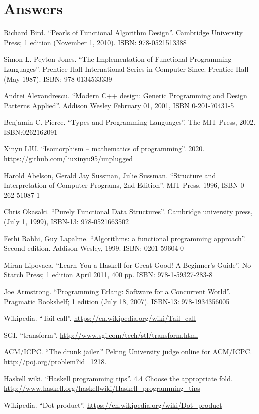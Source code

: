 \documentclass[b5paper]{article}
\begin{document}
\ifx\wholebook\relax \else
\section{Answers}
\shipoutAnswer

\begin{thebibliography}{99}

Richard Bird. ``Pearls of Functional Algorithm Design''. Cambridge University Press; 1 edition (November 1, 2010). ISBN: 978-0521513388

Simon L. Peyton Jones. ``The Implementation of Functional Programming Languages''. Prentice-Hall International Series in Computer Since. Prentice Hall (May 1987). ISBN: 978-0134533339

Andrei Alexandrescu. ``Modern C++ design: Generic Programming and Design Patterns Applied''. Addison Wesley February 01, 2001, ISBN 0-201-70431-5

Benjamin C. Pierce. ``Types and Programming Languages''. The MIT Press, 2002. ISBN:0262162091

Xinyu LIU. ``Isomorphism -- mathematics of programming''. 2020. \url{https://github.com/liuxinyu95/unplugged}

Harold Abelson, Gerald Jay Sussman, Julie Sussman. ``Structure and Interpretation of Computer Programs, 2nd Edition''. MIT Press, 1996, ISBN 0-262-51087-1

Chris Okasaki. ``Purely Functional Data Structures''. Cambridge university press, (July 1, 1999), ISBN-13: 978-0521663502

Fethi Rabhi, Guy Lapalme. ``Algorithms: a functional programming approach''. Second edition. Addison-Wesley, 1999. ISBN: 0201-59604-0

Miran Lipovaca. ``Learn You a Haskell for Great Good! A Beginner's Guide''. No Starch Press; 1 edition April 2011, 400 pp. ISBN: 978-1-59327-283-8

Joe Armstrong. ``Programming Erlang: Software for a Concurrent World''. Pragmatic Bookshelf; 1 edition (July 18, 2007). ISBN-13: 978-1934356005

Wikipedia. ``Tail call''. \url{https://en.wikipedia.org/wiki/Tail_call}

SGI. ``transform''. \url{http://www.sgi.com/tech/stl/transform.html}

ACM/ICPC. ``The drunk jailer.'' Peking University judge online for ACM/ICPC. \url{http://poj.org/problem?id=1218}.

Haskell wiki. ``Haskell programming tips''. 4.4 Choose the appropriate fold. \url{http://www.haskell.org/haskellwiki/Haskell_programming_tips}

Wikipedia. ``Dot product''. \url{https://en.wikipedia.org/wiki/Dot_product}

\end{thebibliography}

\expandafter\enddocument
\fi
\end{document}
